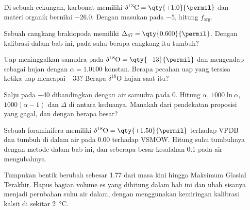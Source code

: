\begin{exercise}[$\star$]\label{exo:b3:stable-isotopes:3}
Di sebuah cekungan, karbonat memiliki $\delta^{13}\mathrm C = \qty{+1.0}{\permil}$ dan materi organik
bernilai \qty{-26.0}{\permil}. Dengan masukan pada \qty{-5}{\permil}, hitung
$f_{\mathrm{org}}$.
\end{exercise}

\begin{exercise}[$\star$]\label{exo:b3:stable-isotopes:4}
Sebuah cangkang brakiopoda memiliki $\Delta_{47} = \qty{0.600}{\permil}$. Dengan kalibrasi
dalam bab ini, pada suhu berapa cangkang itu tumbuh?
\end{exercise}

\begin{exercise}[$\star\star$]\label{exo:b3:stable-isotopes:5}
Uap meninggalkan samudra pada $\delta^{18}\mathrm O = \qty{-13}{\permil}$ dan
mengendap sebagai hujan dengan $\alpha = 1.0100$ konstan. Berapa pecahan uap yang tersisa ketika
uap mencapai \qty{-33}{\permil}? Berapa $\delta^{18}\mathrm O$ hujan
saat itu?
\end{exercise}

\begin{exercise}[$\star\star$]\label{exo:b3:stable-isotopes:6}
Salju pada \qty{-40}{\permil} dibandingkan dengan air samudra pada 0. Hitung $\alpha$,
$1000\ln\alpha$, $1000(\alpha - 1)$ dan $\Delta$ di antara keduanya. Manakah dari
pendekatan proposisi yang gagal, dan dengan berapa besar?
\end{exercise}

\begin{exercise}[$\star\star$]\label{exo:b3:stable-isotopes:7}
Sebuah foraminifera memiliki $\delta^{18}\mathrm O = \qty{+1.50}{\permil}$ terhadap VPDB dan tumbuh di dalam
air pada \qty{0.00}{\permil} terhadap VSMOW. Hitung suhu tumbuhnya dengan
metode dalam bab ini, dan seberapa besar kesalahan \qty{0.1}{\permil} pada air
mengubahnya.
\end{exercise}

\begin{exercise}[$\star\star$]\label{exo:b3:stable-isotopes:8}
Tumpukan bentik berubah sebesar \qty{1.77}{\permil} dari masa kini hingga
Maksimum Glasial Terakhir. Hapus bagian volume es yang dihitung dalam bab ini dan
ubah sisanya menjadi perubahan suhu air dalam, dengan menggunakan kemiringan
kalibrasi kalsit di sekitar \qty{2}{\celsius}.
\end{exercise}

